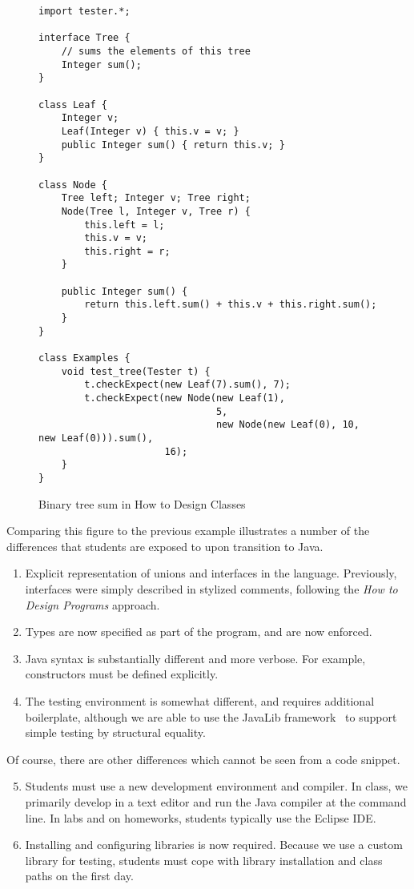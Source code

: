 \documentclass[submission,copyright]{eptcs}
\def\htdp{\emph{How to Design Programs}\xspace}
\begin{document}
\begin{figure}
\begin{verbatim}
import tester.*;

interface Tree {
    // sums the elements of this tree
    Integer sum();
}

class Leaf {
    Integer v;
    Leaf(Integer v) { this.v = v; }
    public Integer sum() { return this.v; }
}

class Node {
    Tree left; Integer v; Tree right;
    Node(Tree l, Integer v, Tree r) {
        this.left = l;
        this.v = v;
        this.right = r;
    }

    public Integer sum() {
        return this.left.sum() + this.v + this.right.sum();
    }
}

class Examples {
    void test_tree(Tester t) {
        t.checkExpect(new Leaf(7).sum(), 7);
        t.checkExpect(new Node(new Leaf(1),
                               5, 
                               new Node(new Leaf(0), 10, new Leaf(0))).sum(),
                      16);
    }
}
\end{verbatim}
\caption{Binary tree sum in How to Design Classes}
\label{fig:java}
\end{figure}

Comparing this figure to the previous example illustrates a number of the
differences that students are exposed to upon transition to Java.

\begin{enumerate}
\item Explicit representation of unions and interfaces in the
  language.  Previously, interfaces were simply described in stylized
  comments, following the \htdp approach.
\item Types are now specified as part of the program, and are now
  enforced.
\item Java syntax is substantially different and more verbose. For
  example, constructors must be defined explicitly.
\item The testing environment is somewhat different, and requires
  additional boilerplate, although we are
  able to use the JavaLib framework~\cite{local:java-world} to support simple testing by
  structural equality.
\end{enumerate}

\noindent
Of course, there are other differences which cannot be seen from a
code snippet.

\begin{enumerate}
  \setcounter{enumi}{4}
\item Students must use a new development environment and compiler.
  In class, we primarily develop in a text editor and run the Java
  compiler at the command line.  In labs and on homeworks, students
  typically use the Eclipse IDE.
\item Installing and configuring libraries is now required.  Because
  we use a custom library for testing, students must cope with library
  installation and class paths on the first day.
\end{enumerate}
\end{document}
